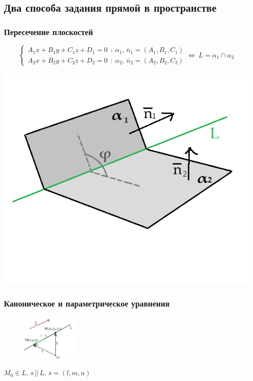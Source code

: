 \documentclass{article}
\begin{document}
\subsection{Два способа задания прямой в пространстве}
\subsubsection{Пересечение плоскостей}
$$ \begin{cases}A_1x+B_1y+C_1z+D_1=0\:\::\:\alpha_1,\,\overline{n}_1=(A_1,B_1,C_1)\\A_2x+B_2y+C_2z+D_2=0\:\::\:\alpha_2,\,\overline{n}_2=(A_2,B_2,C_2) \end{cases} \Leftrightarrow\:L=\alpha_1\cap\alpha_2 $$
\begin{center}
    \includegraphics[scale=0.4]{pic7.png}
\end{center}
\subsubsection{Каноническое и параметрическое уравнения}
\begin{figure}
    \centering
    \includegraphics[width=0.25\textwidth]{pic8.png}
\end{figure}
$M_0\in L,\,\overline{s}\,||\,L,\,\overline{s}=(l,m,n)$
\end{document}

